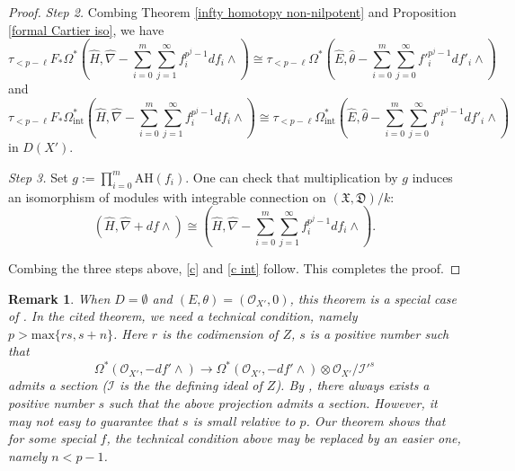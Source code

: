 \documentclass[12pt, a4paper]{article}
\newtheorem{remark}{Remark}[section]
\begin{document}
\begin{proof}
{\itshape Step 2.} Combing Theorem \ref{infty homotopy non-nilpotent} and Proposition \ref{formal Cartier iso}, we have
$$
\tau_{<p-\ell}F_*\Omega^*(\hat H,\hat\nabla-\sum_{i=0}^m\sum_{j=1}^\infty f^{p^j-1}_idf_i\wedge)\cong\tau_{<p-\ell}\Omega^*(\hat E,\hat\theta-\sum_{i=0}^m\sum_{j=0}^\infty f'^{p^j-1}_idf'_i\wedge)
$$
and
$$
\tau_{<p-\ell}F_*\Omega_\mathrm{int}^*(\hat H,\hat\nabla-\sum_{i=0}^m\sum_{j=1}^\infty f^{p^j-1}_idf_i\wedge)\cong\tau_{<p-\ell}\Omega_\mathrm{int}^*(\hat E,\hat\theta-\sum_{i=0}^m\sum_{j=0}^\infty f'^{p^j-1}_idf'_i\wedge)
$$
in $D(X')$.

{\itshape Step 3.} Set $g:=\prod_{i=0}^m\mathrm{AH}(f_i)$. One can check that multiplication by $g$ induces an isomorphism of modules with integrable connection on $(\mathfrak X,\mathfrak D)/k$:
$$
(\hat H,\hat\nabla+df\wedge)\cong(\hat H,\hat\nabla-\sum_{i=0}^m\sum_{j=1}^\infty f^{p^j-1}_idf_i\wedge).
$$

Combing the three steps above, \eqref{c} and \eqref{c int} follow. This completes the proof.
\end{proof}
\begin{remark}
When $D=\emptyset$ and $(E,\theta)=(\mathcal O_{X'},0)$, this theorem is a special case of \cite[Teorem 4.23 (2)]{OV}. In the cited theorem,  we need a technical condition, namely $p>\mathrm{max}\{rs,s+n\}$. Here $r$ is the codimension of $Z$, $s$ is a positive number such that
$$
\Omega^*(\mathcal O_{X'},-df'\wedge)\to\Omega^*(\mathcal O_{X'},-df'\wedge)\otimes\mathcal O_{X'}/\mathcal I'^s
$$
admits a section ($\mathcal I$ is the the defining ideal of $Z$).  By \cite[Corollary 4.32]{OV}, there always exists a positive number $s$ such that the above projection admits a section. However, it may not easy to guarantee that $s$ is \emph{small}  relative to $p$. Our theorem shows that for some special $f$, the technical condition above may be replaced by an easier one, namely $n<p-1$. 
\end{remark}
\end{document}

